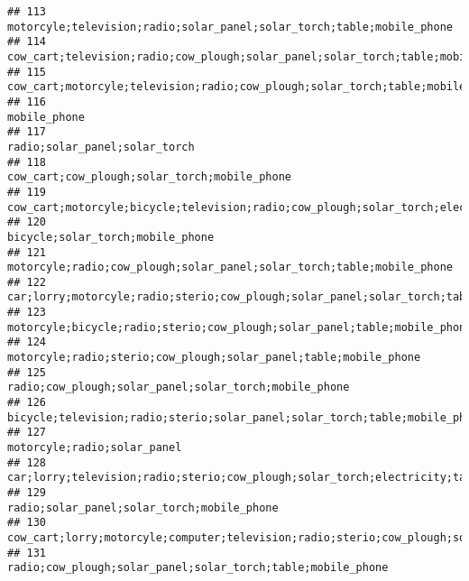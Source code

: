 \documentclass[
]{article}
\begin{document}
\begin{verbatim}
## 113                                                                    motorcyle;television;radio;solar_panel;solar_torch;table;mobile_phone
## 114                                                          cow_cart;television;radio;cow_plough;solar_panel;solar_torch;table;mobile_phone
## 115                                                            cow_cart;motorcyle;television;radio;cow_plough;solar_torch;table;mobile_phone
## 116                                                                                                                             mobile_phone
## 117                                                                                                            radio;solar_panel;solar_torch
## 118                                                                                             cow_cart;cow_plough;solar_torch;mobile_phone
## 119                        cow_cart;motorcyle;bicycle;television;radio;cow_plough;solar_torch;electricity;table;sofa_set;mobile_phone;fridge
## 120                                                                                                         bicycle;solar_torch;mobile_phone
## 121                                                                    motorcyle;radio;cow_plough;solar_panel;solar_torch;table;mobile_phone
## 122                                   car;lorry;motorcyle;radio;sterio;cow_plough;solar_panel;solar_torch;table;sofa_set;mobile_phone;fridge
## 123                                                                 motorcyle;bicycle;radio;sterio;cow_plough;solar_panel;table;mobile_phone
## 124                                                                         motorcyle;radio;sterio;cow_plough;solar_panel;table;mobile_phone
## 125                                                                                    radio;cow_plough;solar_panel;solar_torch;mobile_phone
## 126                                                               bicycle;television;radio;sterio;solar_panel;solar_torch;table;mobile_phone
## 127                                                                                                              motorcyle;radio;solar_panel
## 128                                  car;lorry;television;radio;sterio;cow_plough;solar_torch;electricity;table;sofa_set;mobile_phone;fridge
## 129                                                                                               radio;solar_panel;solar_torch;mobile_phone
## 130                    cow_cart;lorry;motorcyle;computer;television;radio;sterio;cow_plough;solar_panel;solar_torch;electricity;mobile_phone
## 131                                                                              radio;cow_plough;solar_panel;solar_torch;table;mobile_phone

\end{verbatim}
\end{document}

